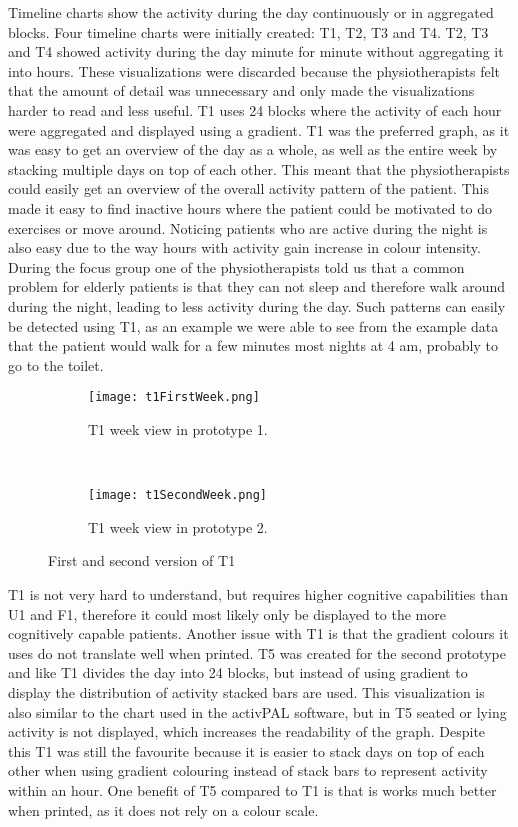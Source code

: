 Timeline charts show the activity during the day continuously or in aggregated blocks. Four timeline charts were initially created: T1, T2, T3 and T4. T2, T3 and T4 showed activity during the day minute for minute without aggregating it into hours. These visualizations were discarded because the physiotherapists felt that the amount of detail was unnecessary and only made the visualizations harder to read and less useful. T1 uses 24 blocks where the activity of each hour were aggregated and displayed using a gradient. T1 was the preferred graph, as it was easy to get an overview of the day as a whole, as well as the entire week by stacking multiple days on top of each other. This meant that the physiotherapists could easily get an overview of the overall activity pattern of the patient. This made it easy to find inactive hours where the patient could be motivated to do exercises or move around. Noticing patients who are active during the night is also easy due to the way hours with activity gain increase in colour intensity. During the focus group one of the physiotherapists told us that a common problem for elderly patients is that they can not sleep and therefore walk around during the night, leading to less activity during the day. Such patterns can easily be detected using T1, as an example we were able to see from the example data that the patient would walk for a few minutes most nights at 4 am, probably to go to the toilet.

\begin{figure}[h!]
  \centering
  \begin{subfigure}[b]{0.7\textwidth}
    \centering
    \texttt{[image: t1FirstWeek.png]}
    \caption{T1 week view in prototype 1.}
  \end{subfigure}
  \\
  \begin{subfigure}[b]{0.7\textwidth}
    \centering
    \texttt{[image: t1SecondWeek.png]}
    \caption{T1 week view in prototype 2.}
  \end{subfigure} 
  \caption{First and second version of T1}
  \label{fig:tComparison}
\end{figure} 

T1 is not very hard to understand, but requires higher cognitive capabilities than U1 and F1, therefore it could most likely only be displayed to the more cognitively capable patients. Another issue with T1 is that the gradient colours it uses do not translate well when printed. T5 was created for the second prototype and like T1 divides the day into 24 blocks, but instead of using gradient to display the distribution of activity stacked bars are used. This visualization is also similar to the chart used in the activPAL software, but in T5 seated or lying activity is not displayed, which increases the readability of the graph. Despite this T1 was still the favourite because it is easier to stack days on top of each other when using gradient colouring instead of stack bars to represent activity within an hour. One benefit of T5 compared to T1 is that is works much better when printed, as it does not rely on a colour scale.

